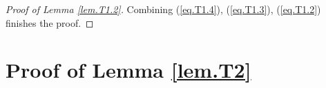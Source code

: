 \documentclass[11pt]{article} %
\begin{document}
\begin{proof}[Proof of Lemma \ref{lem.T1.2}]
	Combining (\ref{eq.T1.4}), (\ref{eq.T1.3}), (\ref{eq.T1.2}) finishes the proof.  
	
\end{proof}

\section{Proof of Lemma \ref{lem.T2}}\label{lem.T2.proof}
\end{document}
